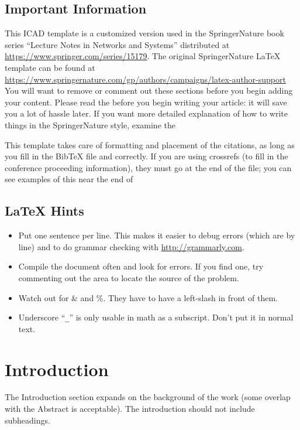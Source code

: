 \documentclass[sn-mathphys,pdflatex]{sn-jnl}%
\theoremstyle{thmstyleone}%
\theoremstyle{thmstyletwo}%
\theoremstyle{thmstylethree}%
\begin{document}
\subsection*{Important Information}\label{sec:important-info}
This ICAD template is a customized version used in the SpringerNature book series ``Lecture Notes in Networks and Systems'' distributed at \url{https://www.springer.com/series/15179}.
The original SpringerNature \LaTeX{} template can be found at \url{https://www.springernature.com/gp/authors/campaigns/latex-author-support}
You will want to remove or comment out these sections before you begin adding your content.
Please read the  before you begin writing your article:  it will save you a lot of hassle later.
If you want more detailed explanation of how to write things in the SpringerNature style, examine the 


  This template takes care of formatting and placement of the citations, as long as you fill in the BibTeX file  and  correctly.
  If you are using crossrefs (to fill in the conference proceeding information), they must go at the end of the  file;  you can see examples of this near the end of 

\subsection*{\LaTeX{} Hints}\label{sec:latex-hints}
\begin{itemize}
\item Put one sentence per line.
  This makes it easier to debug errors (which are by line) and to do grammar checking with \url{http://grammarly.com}.
\item Compile the document often and look for errors.
  If you find one, try commenting out the area to locate the source of the problem.
\item Watch out for \& and \%.  They have to have a left-slash in front of them.
\item Underscore ``\verb|_|'' is only usable in math as a subscript.
  Don't put it in normal text.
\end{itemize}


\section{Introduction}\label{sec:introduction}
The Introduction section expands on the background of the work (some overlap with the Abstract is acceptable).
The introduction should not include subheadings.
\end{document}
